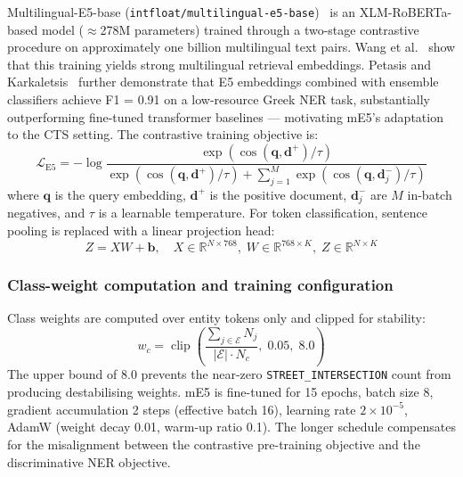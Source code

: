 Multilingual-E5-base (\texttt{intfloat/multilingual-e5-base})~\cite{wang2023e5} is an XLM-RoBERTa-based model ($\approx$278M parameters) trained through a two-stage contrastive procedure on approximately one billion multilingual text pairs. Wang et al.~\cite{wang2023e5} show that this training yields strong multilingual retrieval embeddings. Petasis and Karkaletsis~\cite{petasis2024greek} further demonstrate that E5 embeddings combined with ensemble classifiers achieve F1 = 0.91 on a low-resource Greek NER task, substantially outperforming fine-tuned transformer baselines — motivating mE5's adaptation to the CTS setting. The contrastive training objective is:
\begin{equation}
  \mathcal{L}_{\text{E5}} = -\log \frac{\exp\!\left(\cos(\mathbf{q}, \mathbf{d}^+) / \tau\right)}{\exp\!\left(\cos(\mathbf{q}, \mathbf{d}^+) / \tau\right) + \displaystyle\sum_{j=1}^{M} \exp\!\left(\cos(\mathbf{q}, \mathbf{d}^-_j) / \tau\right)}
  \label{eq:e5_contrastive}
\end{equation}
where $\mathbf{q}$ is the query embedding, $\mathbf{d}^+$ is the positive document, $\mathbf{d}^-_j$ are $M$ in-batch negatives, and $\tau$ is a learnable temperature. For token classification, sentence pooling is replaced with a linear projection head:
\begin{equation}
  Z = XW + \mathbf{b}, \quad X \in \mathbb{R}^{N \times 768},\; W \in \mathbb{R}^{768 \times K},\; Z \in \mathbb{R}^{N \times K}
  \label{eq:me5_head}
\end{equation}

\subsubsection{Class-weight computation and training configuration}

Class weights are computed over entity tokens only and clipped for stability:
\begin{equation}
  w_c = \operatorname{clip}\!\left(\frac{\displaystyle\sum_{j \in \mathcal{E}} N_j}{\lvert\mathcal{E}\rvert \cdot N_c},\; 0.05,\; 8.0\right)
  \label{eq:me5_weights}
\end{equation}
The upper bound of 8.0 prevents the near-zero \texttt{STREET\_INTERSECTION} count from producing destabilising weights. mE5 is fine-tuned for 15 epochs, batch size 8, gradient accumulation 2 steps (effective batch 16), learning rate $2 \times 10^{-5}$, AdamW (weight decay 0.01, warm-up ratio 0.1). The longer schedule compensates for the misalignment between the contrastive pre-training objective and the discriminative NER objective.


